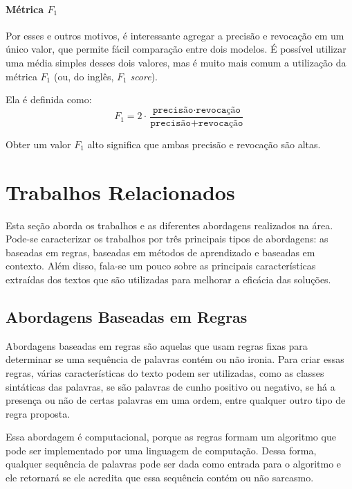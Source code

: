 \paragraph{Métrica $F_1$}%
\label{par:metrica_f_1_}

Por esses e outros motivos, é interessante agregar a precisão e revocação em um
único valor, que permite fácil comparação entre dois modelos. É possível
utilizar uma média simples desses dois valores, mas é muito mais comum a
utilização da métrica $F_1$ (ou, do inglês, $F_1$ \textit{score}).

Ela é definida como:
\[
F_1=2\cdot
\dfrac{\texttt{precisão}\cdot\texttt{revocação}}
{\texttt{precisão}+\texttt{revocação}}
\]

Obter um valor $F_1$ alto significa que ambas precisão e revocação são altas.

\section{Trabalhos Relacionados}%
\label{sec:trabalhos_relacionados}

Esta seção aborda os trabalhos e as diferentes abordagens realizados na área.
Pode-se caracterizar os trabalhos por três principais tipos de abordagens: as
baseadas em regras, baseadas em métodos de aprendizado e baseadas em contexto.
Além disso, fala-se um pouco sobre as principais características extraídas dos
textos que são utilizadas para melhorar a eficácia das soluções.

\subsection{Abordagens Baseadas em Regras}%
\label{sub:abordagens_baseados_em_regras}

Abordagens baseadas em regras são aquelas que usam regras fixas para determinar
se uma sequência de palavras contém ou não ironia. Para criar essas regras,
várias características do texto podem ser utilizadas, como as classes sintáticas
das palavras, se são palavras de cunho positivo ou negativo, se há a presença ou
não de certas palavras em uma ordem, entre qualquer outro tipo de regra
proposta.

Essa abordagem é computacional, porque as regras formam um algoritmo que pode
ser implementado por uma linguagem de computação. Dessa forma, qualquer
sequência de palavras pode ser dada como entrada para o algoritmo e ele
retornará se ele acredita que essa sequência contém ou não sarcasmo.

